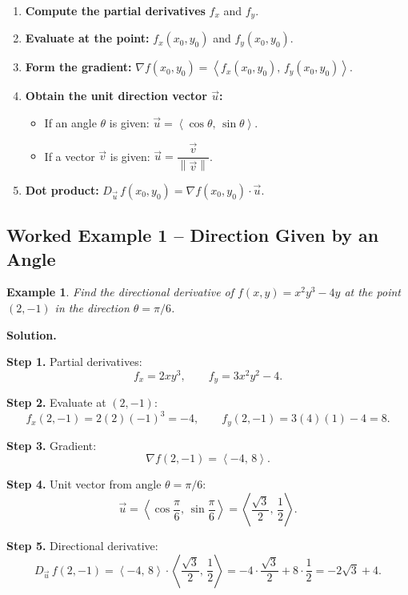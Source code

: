 \documentclass[12pt]{article}
\newtheorem{example}{Example}
\newcommand{\vect}[1]{\vec{#1}}
\newcommand{\grad}{\nabla}
\newcommand{\norm}[1]{\left\| #1 \right\|}
\newcommand{\inner}[2]{\left\langle #1,\, #2 \right\rangle}
\begin{document}
\begin{enumerate}
  \item \textbf{Compute the partial derivatives} $f_x$ and $f_y$.
  \item \textbf{Evaluate at the point:} $f_x(x_0,y_0)$ and $f_y(x_0,y_0)$.
  \item \textbf{Form the gradient:}
        $\grad f(x_0,y_0) = \inner{f_x(x_0,y_0)}{f_y(x_0,y_0)}$.
  \item \textbf{Obtain the unit direction vector $\vect{u}$:}
        \begin{itemize}
          \item If an angle $\theta$ is given:
                $\vect{u}=\inner{\cos\theta}{\sin\theta}$.
          \item If a vector $\vect{v}$ is given:
                $\vect{u}=\dfrac{\vect{v}}{\norm{\vect{v}}}$.
        \end{itemize}
  \item \textbf{Dot product:}
        $D_{\vect{u}}\,f(x_0,y_0) = \grad f(x_0,y_0)\cdot\vect{u}$.
\end{enumerate}

\subsection{Worked Example 1 -- Direction Given by an Angle}

\begin{example}
Find the directional derivative of
$f(x,y) = x^2 y^3 - 4y$
at the point $(2,-1)$ in the direction $\theta = \pi/6$.
\end{example}

\textbf{Solution.}

\medskip
\noindent\textbf{Step 1.} Partial derivatives:
\[
  f_x = 2xy^3, \qquad f_y = 3x^2 y^2 - 4.
\]

\noindent\textbf{Step 2.} Evaluate at $(2,-1)$:
\[
  f_x(2,-1) = 2(2)(-1)^3 = -4, \qquad
  f_y(2,-1) = 3(4)(1) - 4 = 8.
\]

\noindent\textbf{Step 3.} Gradient:
\[
  \grad f(2,-1) = \inner{-4}{8}.
\]

\noindent\textbf{Step 4.} Unit vector from angle $\theta=\pi/6$:
\[
  \vect{u}
    = \inner{\cos\frac{\pi}{6}}{\sin\frac{\pi}{6}}
    = \inner{\frac{\sqrt{3}}{2}}{\frac{1}{2}}.
\]

\noindent\textbf{Step 5.} Directional derivative:
\[
  D_{\vect{u}}\,f(2,-1)
    = \inner{-4}{8} \cdot \inner{\frac{\sqrt{3}}{2}}{\frac{1}{2}}
    = -4\cdot\frac{\sqrt{3}}{2} + 8\cdot\frac{1}{2}
    = -2\sqrt{3} + 4.
\]
\end{document}
